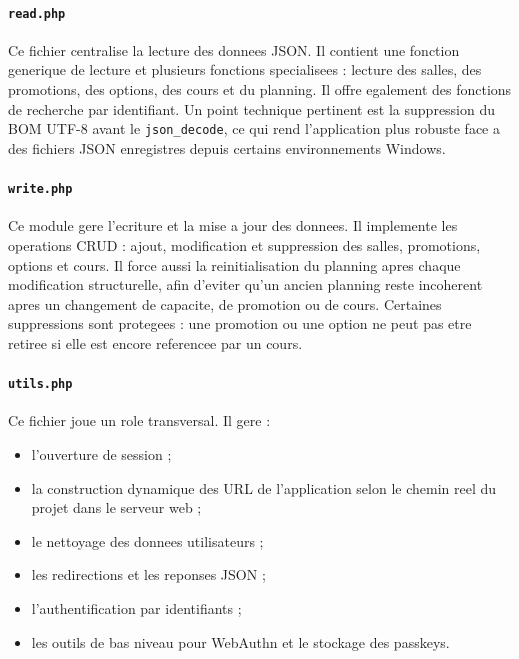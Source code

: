 \documentclass[12pt,a4paper]{article}
\begin{document}
\paragraph{\texttt{read.php}}
Ce fichier centralise la lecture des donnees JSON. Il contient une fonction generique de lecture et plusieurs fonctions specialisees : lecture des salles, des promotions, des options, des cours et du planning. Il offre egalement des fonctions de recherche par identifiant. Un point technique pertinent est la suppression du BOM UTF-8 avant le \texttt{json\_decode}, ce qui rend l'application plus robuste face a des fichiers JSON enregistres depuis certains environnements Windows.

\paragraph{\texttt{write.php}}
Ce module gere l'ecriture et la mise a jour des donnees. Il implemente les operations CRUD : ajout, modification et suppression des salles, promotions, options et cours. Il force aussi la reinitialisation du planning apres chaque modification structurelle, afin d'eviter qu'un ancien planning reste incoherent apres un changement de capacite, de promotion ou de cours. Certaines suppressions sont protegees : une promotion ou une option ne peut pas etre retiree si elle est encore referencee par un cours.

\paragraph{\texttt{utils.php}}
Ce fichier joue un role transversal. Il gere :
\begin{itemize}
    \item l'ouverture de session ;
    \item la construction dynamique des URL de l'application selon le chemin reel du projet dans le serveur web ;
    \item le nettoyage des donnees utilisateurs ;
    \item les redirections et les reponses JSON ;
    \item l'authentification par identifiants ;
    \item les outils de bas niveau pour WebAuthn et le stockage des passkeys.
\end{itemize}
\end{document}
